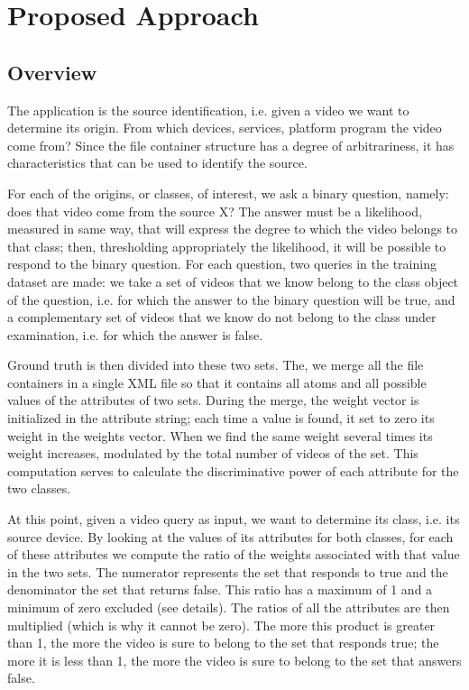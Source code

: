 \chapter{Proposed Approach}

\section{Overview}

The application is the source identification, i.e. given a video we want to determine its origin. From which devices, services, platform program the video come from? Since the file container structure has a degree of arbitrariness, it has characteristics that can be used to identify the source.

For each of the origins, or classes, of interest, we ask a binary question, namely: does that video come from the source X? The answer must be a likelihood, measured in same way, that will express the degree to which the video belongs to that class; then, thresholding appropriately the likelihood, it will be possible to respond to the binary question.
For each question, two queries in the training dataset are made: we take a set of videos that we know belong to the class object of the question, i.e. for which the answer to the binary question will be true, and a complementary set of videos that we know do not belong to the class under examination, i.e. for which the answer is false.

Ground truth is then divided into these two sets. The, we merge all the file containers in a single XML file so that it contains all atoms and all possible values of the attributes of two sets. During the merge, the weight vector is initialized in the attribute string; each time a value is found, it set to zero its weight in the weights vector. When we find the same weight several times its weight increases, modulated by the total number of videos of the set. This computation serves to calculate the discriminative power of each attribute for the two classes.

At this point, given a video query as input, we want to determine its class, i.e. its source device. By looking at the values of its attributes for both classes, for each of these attributes we compute the ratio of the weights associated with that value in the two sets. The numerator represents the set that responds to true and the denominator the set that returns false. This ratio has a maximum of 1 and a minimum of zero excluded (see details). The ratios of all the attributes are then multiplied (which is why it cannot be zero). The more this product is greater than 1, the more the video is sure to belong to the set that responds true; the more it is less than 1, the more the video is sure to belong to the set that answers false.

